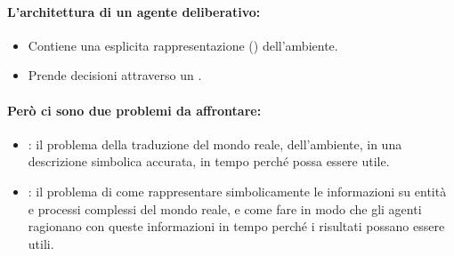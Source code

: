 \paragraph{L'architettura di un agente deliberativo:}

\begin{itemize}
  \item Contiene una esplicita rappresentazione () dell'ambiente. 
  \item Prende decisioni attraverso un .
\end{itemize}

\paragraph{Però ci sono due problemi da affrontare:}

\begin{itemize}
  \item {}: il problema della traduzione del mondo reale, dell'ambiente, in una descrizione simbolica accurata, in tempo perché possa essere utile.
  \item {}: il problema di come rappresentare simbolicamente le informazioni su entità e processi complessi del mondo reale, e come fare in modo che gli agenti ragionano con queste informazioni in tempo perché i risultati possano essere utili.
\end{itemize}


